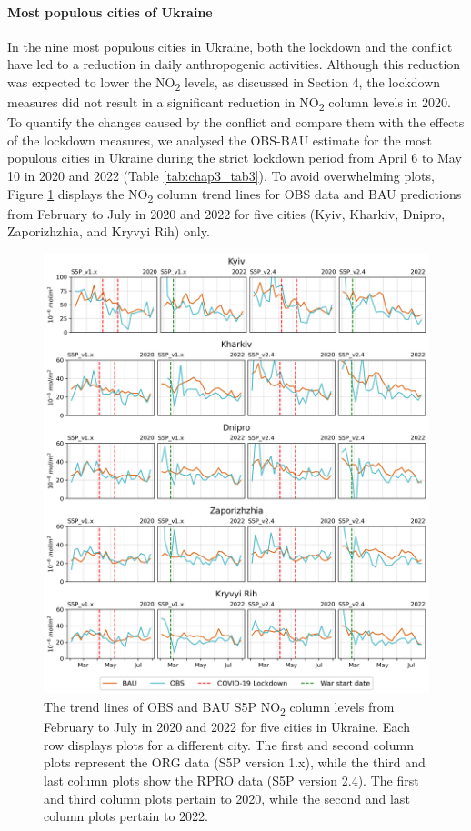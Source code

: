 \paragraph*{Most populous cities of Ukraine}
In the nine most populous cities in Ukraine, both the lockdown and the conflict have led to a reduction in daily anthropogenic activities. Although this reduction was expected to lower the NO\textsubscript{2} levels, as discussed in Section 4, the lockdown measures did not result in a significant reduction in NO\textsubscript{2} column levels in 2020. To quantify the changes caused by the conflict and compare them with the effects of the lockdown measures, we analysed the OBS-BAU estimate for the most populous cities in Ukraine during the strict lockdown period from April 6 to May 10 in 2020 and 2022 (Table \ref{tab:chap3_tab3}). To avoid overwhelming plots, Figure \ref{fig:chap3_fig8} displays the NO\textsubscript{2} column trend lines for OBS data and BAU predictions from February to July in 2020 and 2022 for five cities (Kyiv, Kharkiv, Dnipro, Zaporizhzhia, and Kryvyi Rih) only.\par
\begin{figure}[p]
    \centering
    \includegraphics[width=\textwidth]{figs/chap3/fig8.png}
    \caption[OBS and BAU S5P NO\textsubscript{2} trends (2020-2022) in populous cities]{The trend lines of OBS and BAU S5P NO\textsubscript{2} column levels from February to July in 2020 and 2022 for five cities in Ukraine. Each row displays plots for a different city. The first and second column plots represent the ORG data (S5P version 1.x), while the third and last column plots show the RPRO data (S5P version 2.4). The first and third column plots pertain to 2020, while the second and last column plots pertain to 2022.}
    \label{fig:chap3_fig8}
\end{figure}


